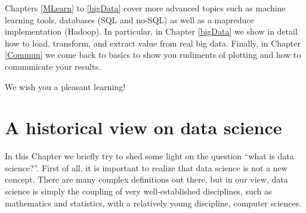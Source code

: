 \documentclass[10pt]{PhDthesisPSnPDF}%
\begin{document}
Chapters \ref{MLearn} to \ref{bigData} cover more advanced topics such as machine learning tools, databases (SQL and no-SQL) as well as a mapreduce implementation (Hadoop). In particular, in Chapter \ref{bigData} we show in detail how to load, transform, and extract value from real big data. Finally, in Chapter \ref{Commun} we come back to basics to show you rudiments of plotting and how to communicate your results. 

We wish you a pleasant learning!

\newpage
\thispagestyle{empty}
\mbox{}
\cleardoublepage

\setcounter{tocdepth}{2}




\setcounter{secnumdepth}{3} %
\setcounter{tocdepth}{2}    %
\tableofcontents            %


	


\cleardoublepage
\newpage
{}	 %

\chapter{A historical view on data science}\label{DS} 

In this Chapter we briefly try to shed some light on the question ``what is data science?''. First of all, it is important to realize that data science is not a new concept. There are many complex definitions out there, but in our view, data science is simply the coupling of very well-established disciplines, such as mathematics and statistics, with a relatively young discipline, computer sciences. 
\end{document}
